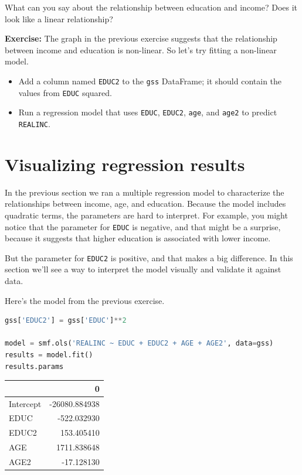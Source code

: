 What can you say about the relationship between education and income?
Does it look like a linear relationship?

\textbf{Exercise:} The graph in the previous exercise suggests that the
relationship between income and education is non-linear. So let's try
fitting a non-linear model.

\begin{itemize}
\item
  Add a column named \passthrough{\lstinline!EDUC2!} to the
  \passthrough{\lstinline!gss!} DataFrame; it should contain the values
  from \passthrough{\lstinline!EDUC!} squared.
\item
  Run a regression model that uses \passthrough{\lstinline!EDUC!},
  \passthrough{\lstinline!EDUC2!}, \passthrough{\lstinline!age!}, and
  \passthrough{\lstinline!age2!} to predict
  \passthrough{\lstinline!REALINC!}.
\end{itemize}

\hypertarget{visualizing-regression-results}{%
\section{Visualizing regression
results}\label{visualizing-regression-results}}

In the previous section we ran a multiple regression model to
characterize the relationships between income, age, and education.
Because the model includes quadratic terms, the parameters are hard to
interpret. For example, you might notice that the parameter for
\passthrough{\lstinline!EDUC!} is negative, and that might be a
surprise, because it suggests that higher education is associated with
lower income.

But the parameter for \passthrough{\lstinline!EDUC2!} is positive, and
that makes a big difference. In this section we'll see a way to
interpret the model visually and validate it against data.

Here's the model from the previous exercise.

\begin{lstlisting}[language=Python,style=source]
gss['EDUC2'] = gss['EDUC']**2

model = smf.ols('REALINC ~ EDUC + EDUC2 + AGE + AGE2', data=gss)
results = model.fit()
results.params
\end{lstlisting}

\begin{tabular}{lr}
\toprule
{} &             0 \\
\midrule
Intercept & -26080.884938 \\
EDUC      &   -522.032930 \\
EDUC2     &    153.405410 \\
AGE       &   1711.838648 \\
AGE2      &    -17.128130 \\
\bottomrule
\end{tabular}

